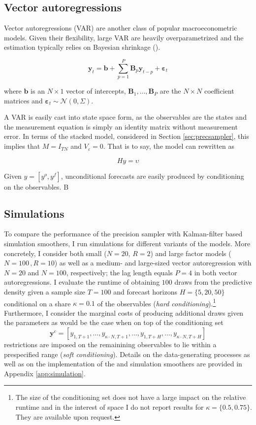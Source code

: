 \documentclass[notitlepage,a4paper,12pt]{article}
\begin{document}
\subsection{Vector autoregressions}\label{sec:var}

Vector autoregressions (VAR) are another class of popular macroeconometric models. Given their flexibility, large VAR are heavily overparametrized and the estimation typically relies on Bayesian shrinkage (). 

\begin{equation}
    \mathbf{y}_t = \mathbf{b} + \sum_{p=1}^P \mathbf{B}_p \mathbf{y}_{t-p} + \boldsymbol{\varepsilon}_t
\end{equation}

where $\mathbf{b}$ is an $N \times 1$ vector of intercepts, $\mathbf{B}_1, \dots, \mathbf{B}_P$ are the $N \times N$ coefficient matrices and $\boldsymbol{\varepsilon}_t \sim \mathcal{N}(0, \Sigma)$.

A VAR is easily cast into state space form, as the observables are the states and the measurement equation is simply an identity matrix without measurement error. In terms of the stacked model, considered in Section \ref{sec:precsampler}, this implies that $M = I_{TN}$ and $V_{\varepsilon} = 0$. That is to say, the model can rewritten as

$$
H y = \upsilon
$$



Given $y=[y^o, y^f]$, unconditional forecasts are easily produced by conditioning on the observables. B

\subsection{Simulations}

To compare the performance of the precision sampler with Kalman-filter based simulation smoothers, I run simulations for different variants of the models. More concretely, I consider both small ($N=20,\,R=2$) and large factor models ($N=100\,,R=10$) as well as a medium- and large-sized vector autoregression with $N=20$ and $N=100$, respectively; the lag length equals $P=4$ in both vector autoregressions. I evaluate the runtime of obtaining $100$ draws from the predictive density given a sample size $T=100$ and forecast horizons $H = \{5, 20, 50\}$ conditional on a share $\kappa = 0.1$ of the observables (\textit{hard conditioning}).\footnote{The size of the conditioning set does not have a large impact on the relative runtime and in the interest of space I do not report results for $\kappa = \{0.5, 0.75\}$. They are available upon request.} Furthermore, I consider the marginal costs of producing additional draws given the parameters as would be the case when on top of the conditioning set $$\mathbf{y}^{c} = [y_{1, T+1}, \dots, y_{\kappa \cdot N, T+1}, \dots, y_{1,T+H}, \dots, y_{\kappa \cdot N, T+H}]$$ restrictions are imposed on the remainining observables to lie within a prespecified range (\textit{soft conditioning}). Details on the data-generating processes as well as on the implementation of the \citet{carterkohn1994_biomtr} and \citet{durbinkoopman2002_biomtr} simulation smoothers are provided in Appendix \ref{app:simulation}.\\
\end{document}
